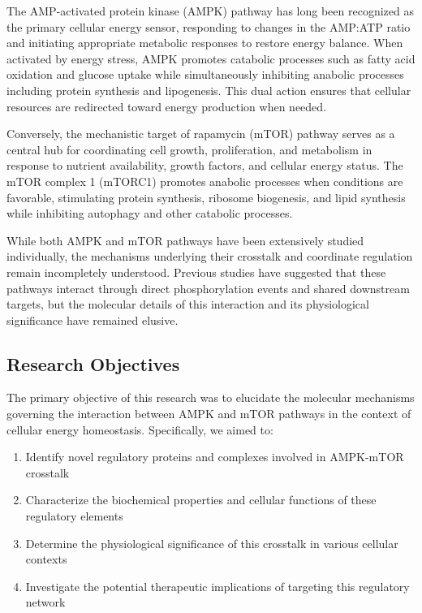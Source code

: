 \documentclass[11pt,a4paper]{article}
\begin{document}
The AMP-activated protein kinase (AMPK) pathway has long been recognized as the primary cellular energy sensor, responding to changes in the AMP:ATP ratio and initiating appropriate metabolic responses to restore energy balance. When activated by energy stress, AMPK promotes catabolic processes such as fatty acid oxidation and glucose uptake while simultaneously inhibiting anabolic processes including protein synthesis and lipogenesis. This dual action ensures that cellular resources are redirected toward energy production when needed.

Conversely, the mechanistic target of rapamycin (mTOR) pathway serves as a central hub for coordinating cell growth, proliferation, and metabolism in response to nutrient availability, growth factors, and cellular energy status. The mTOR complex 1 (mTORC1) promotes anabolic processes when conditions are favorable, stimulating protein synthesis, ribosome biogenesis, and lipid synthesis while inhibiting autophagy and other catabolic processes.

While both AMPK and mTOR pathways have been extensively studied individually, the mechanisms underlying their crosstalk and coordinate regulation remain incompletely understood. Previous studies have suggested that these pathways interact through direct phosphorylation events and shared downstream targets, but the molecular details of this interaction and its physiological significance have remained elusive.

\subsection{Research Objectives}

The primary objective of this research was to elucidate the molecular mechanisms governing the interaction between AMPK and mTOR pathways in the context of cellular energy homeostasis. Specifically, we aimed to:

\begin{enumerate}
\item Identify novel regulatory proteins and complexes involved in AMPK-mTOR crosstalk
\item Characterize the biochemical properties and cellular functions of these regulatory elements
\item Determine the physiological significance of this crosstalk in various cellular contexts
\item Investigate the potential therapeutic implications of targeting this regulatory network
\end{enumerate}
\end{document}
